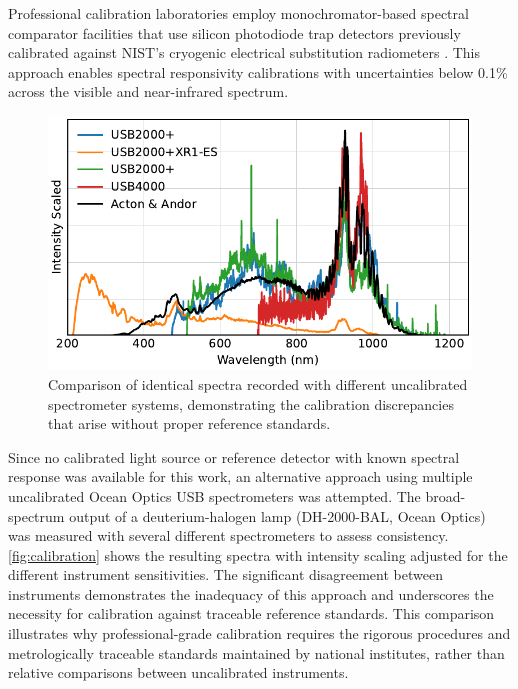 \documentclass[
	parskip=half,
	a4paper,
]{scrarticle}
\begin{document}
Professional calibration laboratories employ monochromator-based spectral comparator facilities that use silicon photodiode trap detectors previously calibrated against NIST's cryogenic electrical substitution radiometers \cite{houston_achievement_2022,larason_nist_1996}. This approach enables spectral responsivity calibrations with uncertainties below 0.1\% across the visible and near-infrared spectrum.

\begin{figure}
    \centering
    \includegraphics{../analysis/figures/efficiency_different.pdf}
    \caption{Comparison of identical spectra recorded with different uncalibrated spectrometer systems, demonstrating the calibration discrepancies that arise without proper reference standards.}
    \label{fig:calibration}
\end{figure}

Since no calibrated light source or reference detector with known spectral response was available for this work, an alternative approach using multiple uncalibrated Ocean Optics USB spectrometers was attempted. The broad-spectrum output of a deuterium-halogen lamp (DH-2000-BAL, Ocean Optics) was measured with several different spectrometers to assess consistency. \autoref{fig:calibration} shows the resulting spectra with intensity scaling adjusted for the different instrument sensitivities. The significant disagreement between instruments demonstrates the inadequacy of this approach and underscores the necessity for calibration against traceable reference standards. This comparison illustrates why professional-grade calibration requires the rigorous procedures and metrologically traceable standards maintained by national institutes, rather than relative comparisons between uncalibrated instruments.
\end{document}
